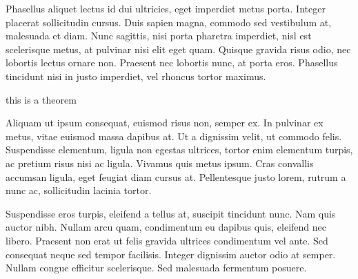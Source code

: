 Phasellus aliquet lectus id dui ultricies, eget imperdiet metus porta. Integer placerat sollicitudin cursus. Duis sapien magna, commodo sed vestibulum at, malesuada et diam. Nunc sagittis, nisi porta pharetra imperdiet, nisl est scelerisque metus, at pulvinar nisi elit eget quam. Quisque gravida risus odio, nec lobortis lectus ornare non. Praesent nec lobortis nunc, at porta eros. Phasellus tincidunt nisi in justo imperdiet, vel rhoncus tortor maximus.

\begin{thm}
     this is a theorem
\end{thm}

Aliquam ut ipsum consequat, euismod risus non, semper ex. In pulvinar ex metus, vitae euismod massa dapibus at. Ut a dignissim velit, ut commodo felis. Suspendisse elementum, ligula non egestas ultrices, tortor enim elementum turpis, ac pretium risus nisi ac ligula. Vivamus quis metus ipsum. Cras convallis accumsan ligula, eget feugiat diam cursus at. Pellentesque justo lorem, rutrum a nunc ac, sollicitudin lacinia tortor.

Suspendisse eros turpis, eleifend a tellus at, suscipit tincidunt nunc. Nam quis auctor nibh. Nullam arcu quam, condimentum eu dapibus quis, eleifend nec libero. Praesent non erat ut felis gravida ultrices condimentum vel ante. Sed consequat neque sed tempor facilisis. Integer dignissim auctor odio at semper. Nullam congue efficitur scelerisque. Sed malesuada fermentum posuere.
